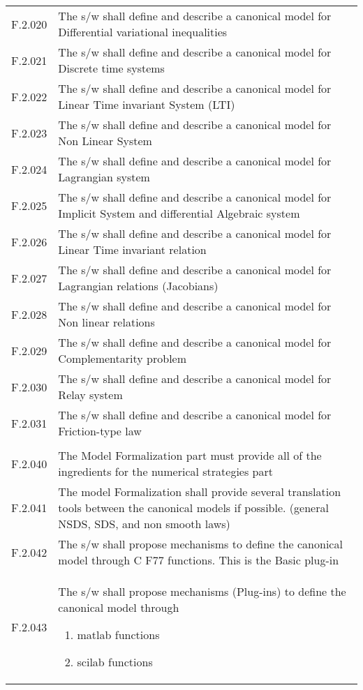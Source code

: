 \begin{longtable}{%
    |>{\columncolor[gray]{.8}}p{}%
    |>{\columncolor[gray]{.95}}p{}|}
  F.2.020  &  The s/w shall  define and describe a canonical model for Differential variational inequalities  \\
  F.2.021  &  The s/w shall  define and describe a canonical model for Discrete time systems\\
  F.2.022  &  The s/w shall  define and describe a canonical model for Linear Time invariant System (LTI)\\ 
  F.2.023  &  The s/w shall  define and describe a canonical model for Non Linear System \\
  F.2.024  &  The s/w shall  define and describe a canonical model for Lagrangian system\\
  F.2.025  &  The s/w shall  define and describe a canonical model for Implicit System and differential Algebraic system\\
  F.2.026  &  The s/w shall  define and describe a canonical model for Linear Time invariant relation  \\  
  F.2.027  &  The s/w shall  define and describe a canonical model for Lagrangian relations (Jacobians)\\  
  F.2.028  &  The s/w shall  define and describe a canonical model for Non linear relations            \\  
  F.2.029  &  The s/w shall  define and describe a canonical model for Complementarity problem   \\  
  F.2.030  &  The s/w shall  define and describe a canonical model for Relay system              \\  
  F.2.031  &  The s/w shall  define and describe a canonical model for Friction-type law\\ 
  & \\
  F.2.040  &  The Model Formalization part must provide all of the ingredients for the numerical strategies part \\
  F.2.041  &  The model Formalization shall provide several  translation tools between the  canonical models if possible. (general NSDS, SDS, and non smooth laws) \\
  F.2.042  &   The s/w shall propose mechanisms to define the canonical model through C F77 functions. This is the Basic plug-in \\
  F.2.043  &   The s/w shall propose mechanisms (Plug-ins) to define the canonical model through 
  \begin{enumerate}
  \item \ac{matlab} functions 
  \item \ac{scilab} functions

\end{enumerate}
\end{longtable}
